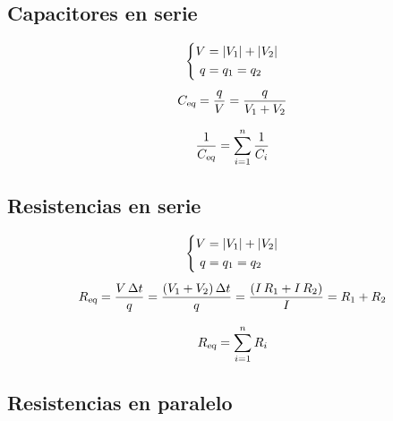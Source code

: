 \subsection{Capacitores en serie}

\begin{gather*}
    \left\{
    \begin{aligned}
        V &= {\left| {V_1} \right|} + {\left| {V_2} \right|}
        \\
        q &= q_1 = q_2
    \end{aligned}
    \right.
    \\[1ex]
    {{C}_\textsl{{eq}}} = \frac{q}{V} = \frac{q}{V_1 + V_2}
\end{gather*}

\begin{mdframed}[style=PropertyFrame]
    \begin{prop}
    \end{prop}
    \begin{equation*}
        \frac{1}{{{C}_\textsl{{eq}}}} = \sum_{i=1}^n \frac{1}{C_i}
    \end{equation*}
\end{mdframed}


\subsection{Resistencias en serie}

\begin{gather*}
    \left\{
    \begin{aligned}
        V &= {\left| {V_1} \right|} + {\left| {V_2} \right|}
        \\
        q &= q_1 = q_2
    \end{aligned}
    \right.
    \\[1ex]
    {{R}_\textsl{{eq}}} = \frac{V \, \Delta t}{q} = \frac{\left(V_1 + V_2\right) \Delta t}{q} = \frac{\left(I \, R_1 + I \, R_2\right)}{I} = R_1 + R_2
\end{gather*}

\begin{mdframed}[style=PropertyFrame]
    \begin{prop}
    \end{prop}
    \begin{equation*}
        {{R}_\textsl{{eq}}} = \sum_{i=1}^n R_i
    \end{equation*}
\end{mdframed}


\subsection{Resistencias en paralelo}


